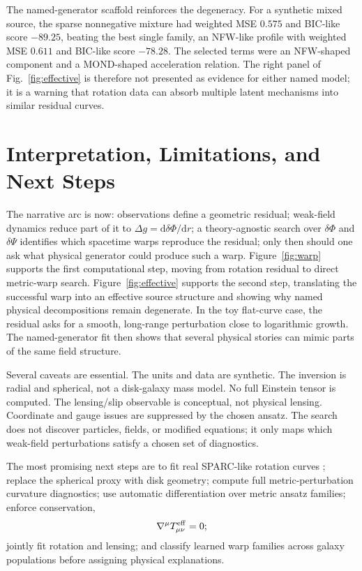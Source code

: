 \documentclass[10pt]{article}
\newcommand{\dd}{\mathrm{d}}
\begin{document}
The named-generator scaffold reinforces the degeneracy. For a synthetic mixed source, the sparse nonnegative mixture had weighted MSE $0.575$ and BIC-like score $-89.25$, beating the best single family, an NFW-like profile with weighted MSE $0.611$ and BIC-like score $-78.28$. The selected terms were an NFW-shaped component and a MOND-shaped acceleration relation. The right panel of Fig.~\ref{fig:effective} is therefore not presented as evidence for either named model; it is a warning that rotation data can absorb multiple latent mechanisms into similar residual curves.

\section{Interpretation, Limitations, and Next Steps}

The narrative arc is now: observations define a geometric residual; weak-field dynamics reduce part of it to $\Delta g=\dd\delta\Phi/\dd r$; a theory-agnostic search over $\delta\Phi$ and $\delta\Psi$ identifies which spacetime warps reproduce the residual; only then should one ask what physical generator could produce such a warp. Figure~\ref{fig:warp} supports the first computational step, moving from rotation residual to direct metric-warp search. Figure~\ref{fig:effective} supports the second step, translating the successful warp into an effective source structure and showing why named physical decompositions remain degenerate. In the toy flat-curve case, the residual asks for a smooth, long-range perturbation close to logarithmic growth. The named-generator fit then shows that several physical stories can mimic parts of the same field structure.

Several caveats are essential. The units and data are synthetic. The inversion is radial and spherical, not a disk-galaxy mass model. No full Einstein tensor is computed. The lensing/slip observable is conceptual, not physical lensing. Coordinate and gauge issues are suppressed by the chosen ansatz. The search does not discover particles, fields, or modified equations; it only maps which weak-field perturbations satisfy a chosen set of diagnostics.

The most promising next steps are to fit real SPARC-like rotation curves \citep{Lelli2016}; replace the spherical proxy with disk geometry; compute full metric-perturbation curvature diagnostics; use automatic differentiation over metric ansatz families; enforce conservation,
\begin{equation}
\nabla^\mu T^{\rm eff}_{\mu\nu}=0;
\end{equation}
jointly fit rotation and lensing; and classify learned warp families across galaxy populations before assigning physical explanations.
\end{document}
